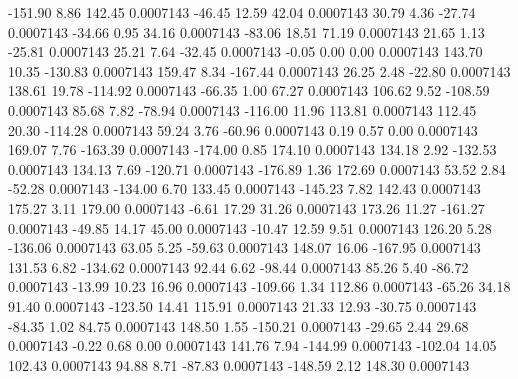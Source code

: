      -151.90        8.86      142.45     0.0007143
      -46.45       12.59       42.04     0.0007143
       30.79        4.36      -27.74     0.0007143
      -34.66        0.95       34.16     0.0007143
      -83.06       18.51       71.19     0.0007143
       21.65        1.13      -25.81     0.0007143
       25.21        7.64      -32.45     0.0007143
       -0.05        0.00        0.00     0.0007143
      143.70       10.35     -130.83     0.0007143
      159.47        8.34     -167.44     0.0007143
       26.25        2.48      -22.80     0.0007143
      138.61       19.78     -114.92     0.0007143
      -66.35        1.00       67.27     0.0007143
      106.62        9.52     -108.59     0.0007143
       85.68        7.82      -78.94     0.0007143
     -116.00       11.96      113.81     0.0007143
      112.45       20.30     -114.28     0.0007143
       59.24        3.76      -60.96     0.0007143
        0.19        0.57        0.00     0.0007143
      169.07        7.76     -163.39     0.0007143
     -174.00        0.85      174.10     0.0007143
      134.18        2.92     -132.53     0.0007143
      134.13        7.69     -120.71     0.0007143
     -176.89        1.36      172.69     0.0007143
       53.52        2.84      -52.28     0.0007143
     -134.00        6.70      133.45     0.0007143
     -145.23        7.82      142.43     0.0007143
      175.27        3.11      179.00     0.0007143
       -6.61       17.29       31.26     0.0007143
      173.26       11.27     -161.27     0.0007143
      -49.85       14.17       45.00     0.0007143
      -10.47       12.59        9.51     0.0007143
      126.20        5.28     -136.06     0.0007143
       63.05        5.25      -59.63     0.0007143
      148.07       16.06     -167.95     0.0007143
      131.53        6.82     -134.62     0.0007143
       92.44        6.62      -98.44     0.0007143
       85.26        5.40      -86.72     0.0007143
      -13.99       10.23       16.96     0.0007143
     -109.66        1.34      112.86     0.0007143
      -65.26       34.18       91.40     0.0007143
     -123.50       14.41      115.91     0.0007143
       21.33       12.93      -30.75     0.0007143
      -84.35        1.02       84.75     0.0007143
      148.50        1.55     -150.21     0.0007143
      -29.65        2.44       29.68     0.0007143
       -0.22        0.68        0.00     0.0007143
      141.76        7.94     -144.99     0.0007143
     -102.04       14.05      102.43     0.0007143
       94.88        8.71      -87.83     0.0007143
     -148.59        2.12      148.30     0.0007143
